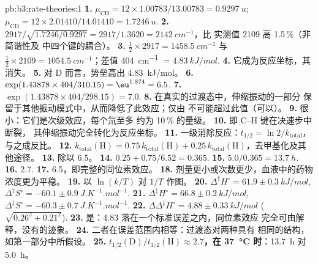\begin{solution}{pb:b3:rate-theories:1}
\textbf{1.} $\mu_{\mathrm{CH}} = 12 \times 1.00783/13.00783 = \qty{0.9297}{u}$; $\mu_{\mathrm{CD}} = 12 \times 2.01410/14.01410 =
\qty{1.7246}{u}$.
\textbf{2.} $2917/\sqrt{1.7246/0.9297} = 2917/1.3620 = \qty{2142}{cm^{-1}}$，比
实测值 2109 高 1.5\,\%（非简谐性及  中四个键的耦合）。
\textbf{3.} $\frac12 \times 2917 = \qty{1458.5}{cm^{-1}}$ 与 $\frac12 \times 2109 = \qty{1054.5}{cm^{-1}}$；差值
\qty{404}{cm^{-1}} $= \qty{4.83}{kJ/mol}$.
\textbf{4.} 它成为反应坐标，其消失。
\textbf{5.} 对 D 而言，势垒高出 \qty{4.83}{kJ/mol}。
\textbf{6.} $\exp(1.43878 \times 404/310.15) = \eu^{1.874} = 6.5$.
\textbf{7.} $\exp(1.43878 \times 404/298.15) = 7.0$.
\textbf{8.} 在真实的过渡态中，伸缩振动的一部分
保留于其他振动模式中，从而降低了此效应；仅由
不可能超过此值（可以）。
\textbf{9.} 很小：它们是次级效应，每个氘至多
约为 10\,\% 的量级。
\textbf{10.} 即 C--H 键在决速步中断裂，
其伸缩振动完全转化为反应坐标。
\textbf{11.} 一级消除反应：$t_{1/2} = \ln2/k_{\mathrm{total}}$，与之成反比。
\textbf{12.} $k_{\mathrm{total}}(\mathrm H) = 0.75\,k_{\mathrm{total}}(\mathrm H) + 0.25\,k_{\mathrm{total}}(\mathrm H)$，去甲基化及其他途径。
\textbf{13.} 除以 6.5。
\textbf{14.} $0.25 + 0.75/6.52 = 0.365$.
\textbf{15.} $5.0/0.365 = \qty{13.7}{h}$.
\textbf{16.} 2.7.
\textbf{17.} 6.5，即完整的同位素效应。
\textbf{18.} 剂量更小或次数更少，血液中的药物浓度更为平稳。
\textbf{19.} 以 $\ln(k/T)$ 对 $1/T$ 作图。
\textbf{20.} $\Delta^{\ddagger}H^\circ = 61.9 \pm \qty{0.3}{kJ/mol}$, $\Delta^{\ddagger}S^\circ = -60.1 \pm \qty{0.9}{J.K^{-1}.mol^{-1}}$.
\textbf{21.} $\Delta^{\ddagger}H^\circ = 66.8 \pm \qty{0.2}{kJ/mol}$, $\Delta^{\ddagger}S^\circ = -60.3 \pm \qty{0.7}{J.K^{-1}.mol^{-1}}$.
\textbf{22.} $\Delta\Delta^{\ddagger}H^\circ = 4.88 \pm \qty{0.33}{kJ/mol}$ ($\sqrt{0.26^2 + 0.21^2}$).
\textbf{23.} 是：4.83 落在一个标准误差之内，同位素效应
完全可由解释，没有的迹象。
\textbf{24.} 二者在误差范围内相等：过渡态对两种具有
相同的结构，如第一部分中所假设。
\textbf{25.} \textbf{$t_{1/2}(\mathrm D)/t_{1/2}(\mathrm H) \approx 2.7$，在 \qty{37}{\celsius} 时}：\qty{13.7}{h} 对 \qty{5.0}{h}。
\end{solution}

